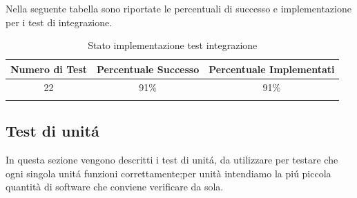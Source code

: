 \documentclass[../PianoDiQualifica.tex]{subfiles}
\begin{document}
Nella seguente tabella sono riportate le percentuali di successo e implementazione per i test di integrazione.
\normalsize
\begin{longtable}{|c|c|c|}
	\hline
	\textbf{Numero di Test} & \textbf{Percentuale Successo} & \textbf{Percentuale Implementati}\\
	\hline
	\endhead
	22 & 91\% & 91\%\\
	\hline
	\caption[Stato implementazione test integrazione]{Stato implementazione test integrazione}
	\label{tabella:Stato implementazione test integrazione}
\end{longtable}
	
		\newpage
		\subsection{Test di unit\'a} 
		In questa sezione vengono descritti i test di unit\'a, da utilizzare per testare che ogni singola unit\'a funzioni correttamente;per unità intendiamo la pi\'u piccola quantità di software che conviene verificare da sola.
		
\end{document}
